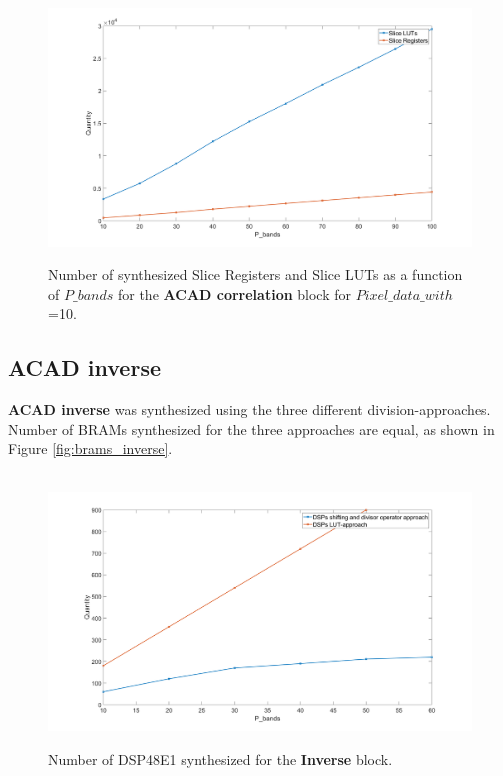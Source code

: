 \begin{figure}[H]

\hbox{\hspace*{-2cm}                                                           
   \includegraphics[scale=0.3]{images/syntese_resultat/acad_correlation_using_pixel_data_with_10_luts_and_registers.png}}
  \caption{Number of synthesized Slice Registers and Slice LUTs as a function of $P\_bands$ for the \textbf{ACAD correlation} block for $Pixel\_data\_with$ =10. } 
  \label{fig:correlation_luts_and_registers_10}
\end{figure}
 
 

\subsection{ACAD inverse}

\textbf{ACAD inverse} was synthesized using the three different division-approaches.  Number of BRAMs synthesized for the three approaches are equal, as shown in Figure \ref{fig:brams_inverse}. 


\begin{figure}[H]

\hbox{\hspace*{-1cm}                                                           
   \includegraphics[scale=0.27]{images/syntese_resultat/inverse/number_of_dsps.png}}
  \caption{Number of DSP48E1 synthesized for the \textbf{Inverse} block. } 
  \label{fig:dsps_inverse}
\end{figure}



